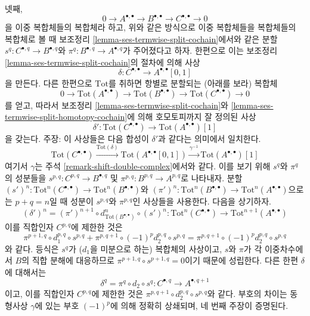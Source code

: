 \begin{remark}
\medskip\noindent
넷째,
$$
0 \to A^{\bullet, \bullet} \to B^{\bullet, \bullet} \to
C^{\bullet, \bullet} \to 0
$$
을 이중 복합체들의 복합체라 하고, 위와 같은 방식으로 이중 복합체들을
복합체들의 복합체로 볼 때 보조정리
\ref{lemma-ses-termwise-split-cochain}에서와 같은 분할
$s^q : C^{\bullet, q} \to B^{\bullet, q}$와
$\pi^q : B^{\bullet, q} \to A^{\bullet, q}$가 주어졌다고 하자.
한편으로 이는 보조정리 \ref{lemma-ses-termwise-split-cochain}의
절차에 의해 사상
$$
\delta : C^{\bullet, \bullet} \longrightarrow A^{\bullet, \bullet}[0, 1]
$$
을 만든다. 다른 한편으로 $\text{Tot}$를 취하면 항별로 분할되는
(아래를 보라) 복합체
$$
0 \to \text{Tot}(A^{\bullet, \bullet}) \to
\text{Tot}(B^{\bullet, \bullet}) \to
\text{Tot}(C^{\bullet, \bullet}) \to 0
$$
를 얻고, 따라서 보조정리 \ref{lemma-ses-termwise-split-cochain}와
\ref{lemma-ses-termwise-split-homotopy-cochain}에 의해 호모토피까지
잘 정의된 사상
$$
\delta' :
\text{Tot}(C^{\bullet, \bullet})
\longrightarrow
\text{Tot}(A^{\bullet, \bullet})[1]
$$
을 갖는다. 주장: 이 사상들은 다음 합성이 $\delta'$과 같다는 의미에서
일치한다.
$$
\text{Tot}(C^{\bullet, \bullet})
\xrightarrow{\text{Tot}(\delta)}
\text{Tot}(A^{\bullet, \bullet}[0, 1]) \xrightarrow{\gamma^{-1}}
\text{Tot}(A^{\bullet, \bullet})[1]
$$
여기서 $\gamma$는 주석 \ref{remark-shift-double-complex}에서와 같다.
이를 보기 위해 $s^q$와 $\pi^q$의 성분들을
$s^{p, q} : C^{p, q} \to B^{\bullet, q}$ 및
$\pi^{p, q} : B^{p, q} \to A^{p, q}$로 나타내자.
분할
$(s')^n : \text{Tot}^n(C^{\bullet, \bullet}) \to
\text{Tot}^n(B^{\bullet, \bullet})$와
$(\pi')^n : \text{Tot}^n(B^{\bullet, \bullet}) \to
\text{Tot}^n(A^{\bullet, \bullet})$으로는 $p + q = n$일 때 성분이
$s^{p, q}$와 $\pi^{p, q}$인 사상들을 사용한다. 다음을 상기하자.
$$
(\delta')^n =
(\pi')^{n + 1} \circ d_{\text{Tot}(B^{\bullet, \bullet})}^n \circ (s')^n :
\text{Tot}^n(C^{\bullet, \bullet}) \to
\text{Tot}^{n + 1}(A^{\bullet, \bullet})
$$
이를 직합인자 $C^{p, q}$에 제한한 것은
$$
\pi^{p + 1, q} \circ
d_1^{p, q} \circ
s^{p, q} +
\pi^{p, q + 1} \circ
(-1)^p d_2^{p, q} \circ
s^{p, q} =
\pi^{p, q + 1} \circ
(-1)^p d_2^{p, q} \circ
s^{p, q}
$$
와 같다. 등식은 $s^q$가 ($d_1$을 미분으로 하는) 복합체의 사상이고,
$s$와 $\pi$가 각 이중차수에서 $B$의 직합 분해에 대응하므로
$\pi^{p + 1, q} \circ s^{p + 1, q} = 0$이기 때문에 성립한다.
다른 한편 $\delta$에 대해서는
$$
\delta^q =  \pi^q \circ d_2 \circ s^q :
C^{\bullet, q} \to A^{\bullet, q + 1}
$$
이고, 이를 직합인자 $C^{p, q}$에 제한한 것은
$\pi^{p, q + 1} \circ d_2^{p, q} \circ s^{p, q}$와 같다.
부호의 차이는 동형사상 $\gamma$에 있는 부호 $(-1)^p$에 의해 정확히
상쇄되며, 네 번째 주장이 증명된다.
\end{remark}

